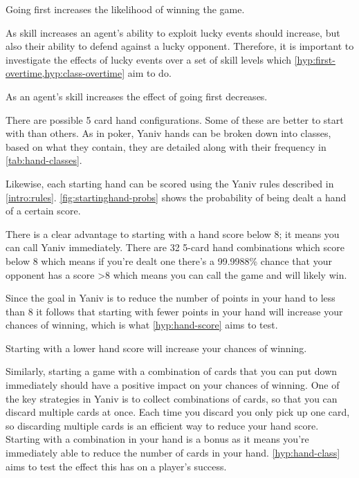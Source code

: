 \documentclass[../main.tex]{subfiles}
\begin{document}
\begin{hyp} \label{hyp:going-first}
Going first increases the likelihood of winning the game.
\end{hyp}

As skill increases an agent's ability to exploit lucky events should increase, but also their ability to defend against a lucky opponent. Therefore, it is important to investigate the effects of lucky events over a set of skill levels which \cref{hyp:first-overtime,hyp:class-overtime} aim to do. 

\begin{hyp} \label{hyp:first-overtime}
As an agent's skill increases the effect of going first decreases. 
\end{hyp}

There are  possible 5 card hand configurations. Some of these are better to start with than others. As in poker, Yaniv hands can be broken down into classes, based on what they contain, they are detailed along with their frequency in \autoref{tab:hand-classes}. 

Likewise, each starting hand can be scored using the Yaniv rules described in \autoref{intro:rules}. \autoref{fig:startinghand-probs} shows the probability of being dealt a hand of a certain score.

There is a clear advantage to starting with a hand score below 8; it means you can call Yaniv immediately. There are 32 5-card hand combinations which score below 8 which means if you're dealt one there's a 99.9988\% chance that  your opponent has a score >8 which means you can call the game and will likely win. 

Since the goal in Yaniv is to reduce the number of points in your hand to less than 8 it follows that starting with fewer points in your hand will increase your chances of winning, which is what \cref{hyp:hand-score} aims to test.

\begin{hyp} \label{hyp:hand-score}
Starting with a lower hand score will increase your chances of winning. 
\end{hyp}

Similarly, starting a game with a combination of cards that you can put down immediately should have a positive impact on your chances of winning. One of the key strategies in Yaniv is to collect combinations of cards, so that you can discard multiple cards at once. Each time you discard you only pick up one card, so discarding multiple cards is an efficient way to reduce your hand score. Starting with a combination in your hand is a bonus as it means you're immediately able to reduce the number of cards in your hand. \cref{hyp:hand-class} aims to test the effect this has on a player's success.
\end{document}
